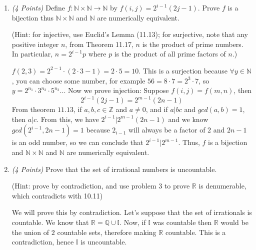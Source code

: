 \documentclass[10pt]{article} %
\newcommand{\N}{\mathbb{N}}
\newcommand{\Z}{\mathbb{Z}}
\newcommand{\R}{\mathbb{R}}
\newcommand{\points}[1]{{\it (#1 Points)}}
\begin{document}
\begin{enumerate}
\begin{enumerate}
\[\begin{array}{lr}
  \end{array}
\right.
\]

\end{enumerate}


\item\points{4} Define $f:\N\times \N\to \N$ by $f(i,j)=2^{i-1}(2j-1)$. Prove $f$ is a bijection thus $\N\times \N$ and $\N$ are numerically equivalent.

    (Hint: for injective, use Euclid's Lemma (11.13); for surjective, note that any positive integer $n$, from Theorem 11.17, $n$ is the product of prime numbers. In particular, $n=2^{i-1}p$ where $p$ is the product of all prime factors of $n$.)
    
     $f(2,3)=2^{2-1}\cdot (2 \cdot 3-1)=2 \cdot 5=10$.  This is a surjection because $\forall y\in \N$, you can choose some number, for example
    $56=8 \cdot 7=2^3 \cdot 7$, so $y=2^{n_1} \cdot 3^{n_2} \cdot 5^{n_3}...$
    Now we prove injection: Suppose $f(i,j)=f(m,n)$, then $$2^{i-1}(2j-1)=2^{m-1}(2n-1)$$
    From theorem $11.13$, if $a,b,c\in \Z$ and $a\neq0$, and if $a|bc$ and $gcd(a,b)=1$, then $a|c$.  From this, we have $2^{i-1}|2^{m-1}(2n-1)$ and we know $gcd(2^{i-1},2n-1)=1$ because $2_{i-1}$ will always be a factor of $2$ and $2n-1$ is an odd number, so we can conclude that $2^{i-1}|2^{m-1}$.  Thus, $f$ is a bijection and $\N \times \N$ and $\N$ are numerically equivalent.  


  \item\points{4} Prove that the set of irrational numbers is uncountable.

  (Hint: prove by contradiction, and use problem 3 to prove $\R$ is denumerable, which contradicts with 10.11)
  
   We will prove this by contradiction.  Let's suppose that the set of irrationals is countable.  We know that $\R=\mathbb{Q}\cup\mathbb{I}$.  Now, if $\mathbb{I}$ was countable then $\R$ would be the union of $2$ countable sets, therefore making $\R$ countable.  This is a contradiction, hence $\mathbb{I}$ is uncountable.  


\end{enumerate}
\end{document}

